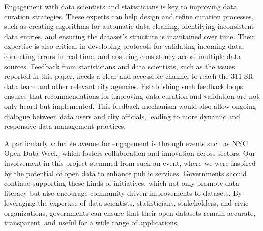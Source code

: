 \documentclass[linenumber]{jdsart}
\begin{document}
Engagement with data scientists and statisticians is key to improving 
data curation strategies. These experts can help design and refine 
curation processes, such as creating algorithms for automatic data 
cleaning, identifying inconsistent data entries, and ensuring the 
dataset’s structure is maintained over time. Their expertise is also 
critical in developing protocols for validating incoming data, correcting 
errors in real-time, and ensuring consistency across multiple data sources. 
Feedback from statisticians and data scientists, such as the issues reported 
in this paper, needs a clear and accessible channel to reach the 311 SR data 
team and other relevant city agencies. Establishing such feedback loops 
ensures that recommendations for improving data curation and validation 
are not only heard but implemented. This feedback mechanism would also allow 
ongoing dialogue between data users and city officials, leading to more dynamic 
and responsive data management practices.


A particularly valuable avenue for engagement is through events such as NYC 
Open Data Week, which fosters collaboration and innovation across sectors. 
Our involvement in this project stemmed from such an event, where we were 
inspired by the potential of open data to enhance public services. Governments 
should continue supporting these kinds of initiatives, which not only promote 
data literacy but also encourage community-driven improvements to datasets. 
By leveraging the expertise of data scientists, statisticians, stakeholders, 
and civic organizations, governments can ensure that their open datasets 
remain accurate, transparent, and useful for a wide range of applications.



\end{document}
